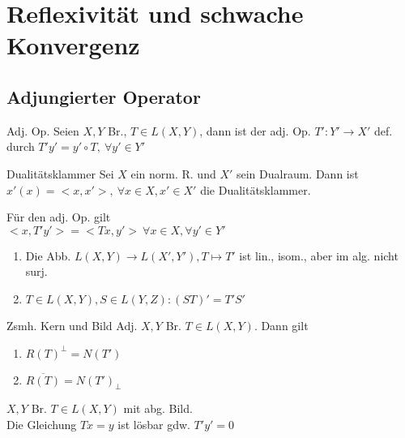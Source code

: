 \section{Reflexivität und schwache Konvergenz}

\subsection{Adjungierter Operator}

\begin{definition}{Adj. Op.}
    Seien \(X,Y\) Br., \(T\in L(X,Y)\), dann ist der adj. Op. \(T':Y'\to X'\)
    def. durch \(T'y' = y' \circ T,\ \forall y'\in Y'\)
\end{definition}

\begin{definition}{Dualitätsklammer}
    Sei \(X\) ein norm. R. und \(X'\) sein Dualraum.
    Dann ist \(x'(x) = <x,x'>,\ \forall x\in X, x'\in X'\)
    die Dualitätsklammer.
\end{definition}

\begin{bemerkung}
    Für den adj. Op. gilt\\
    \(<x,T'y'> = <Tx,y'>\ 
    \forall x\in X,\forall y'\in Y'\)
\end{bemerkung}

\begin{bemerkung}
    \begin{enumerate}[label =(\roman*)]
        \item Die Abb. \(L(X,Y) \to L(X',Y'), T \mapsto T'\) ist lin., isom.,
            aber im alg. nicht surj.
        \item \(T\in L(X,Y), S\in L(Y,Z): (ST)'=T'S'\)
    \end{enumerate}
\end{bemerkung}

\begin{satz}{Zsmh. Kern und Bild Adj.}
    \(X,Y\) Br. \(T\in L(X,Y)\). Dann gilt
    \begin{enumerate}[label = (\roman*)]
        \item \(R(T)^\perp = N(T')\)
        \item \(\overline{R(T)} = N(T')_\perp\)
    \end{enumerate}
\end{satz}

\begin{korrolar}
    \(X,Y\) Br. \(T\in L(X,Y)\) mit abg. Bild.\\
    Die Gleichung \(Tx=y\) ist lösbar gdw. \(T'y' = 0\)
\end{korrolar}


